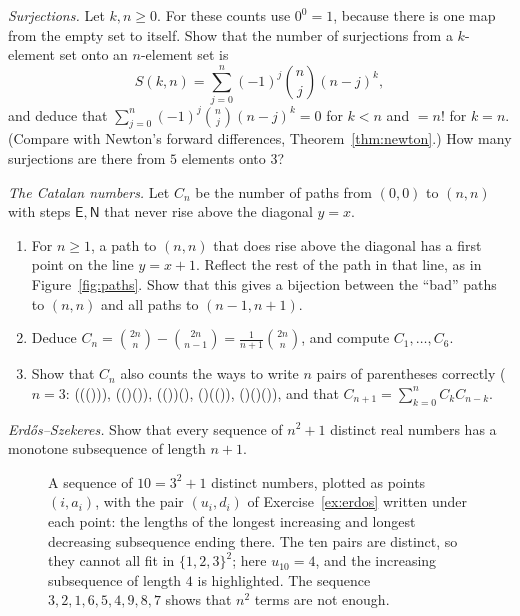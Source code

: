 \begin{exercise}[$\star\star$]\label{ex:surj}
\emph{Surjections.} Let $k,n\ge0$. For these counts use $0^0=1$, because there is one map from the empty set to itself. Show that the number of surjections from a $k$-element set onto an $n$-element set is
\[
S(k,n)=\sum_{j=0}^n(-1)^j\binom nj(n-j)^k ,
\]
and deduce that $\sum_{j=0}^n(-1)^j\binom nj(n-j)^k=0$ for $k<n$ and $=n!$ for $k=n$. (Compare with Newton's forward differences, Theorem~\ref{thm:newton}.) How many surjections are there from $5$ elements onto $3$?
\end{exercise}

\begin{exercise}[$\star\star\star$]\label{ex:catalan}
\emph{The Catalan numbers.} Let $C_n$ be the number of paths from $(0,0)$ to $(n,n)$ with steps $\mathsf E,\mathsf N$ that never rise above the diagonal $y=x$.
\begin{enumerate}[label=(\alph*)]
\item For $n\ge1$, a path to $(n,n)$ that does rise above the diagonal has a first point on the line $y=x+1$. Reflect the rest of the path in that line, as in Figure~\ref{fig:paths}. Show that this gives a bijection between the ``bad'' paths to $(n,n)$ and all paths to $(n-1,n+1)$.
\item Deduce $C_n=\binom{2n}n-\binom{2n}{n-1}=\frac1{n+1}\binom{2n}n$, and compute $C_1,\dots,C_6$.
\item Show that $C_n$ also counts the ways to write $n$ pairs of parentheses correctly ($n=3$: ((())), (()()), (())(), ()(()), ()()()), and that $C_{n+1}=\sum_{k=0}^nC_kC_{n-k}$.
\end{enumerate}
\end{exercise}

\begin{exercise}[$\star\star\star$]\label{ex:erdos}
\emph{Erd\H{o}s--Szekeres.} Show that every sequence of $n^2+1$ distinct real numbers has a monotone subsequence of length $n+1$.
\end{exercise}
\begin{figure}[ht]
\centering
{}
\caption{A sequence of $10=3^2+1$ distinct numbers, plotted as points $(i,a_i)$, with the pair $(u_i,d_i)$ of Exercise~\ref{ex:erdos} written under each point: the lengths of the longest increasing and longest decreasing subsequence ending there. The ten pairs are distinct, so they cannot all fit in $\{1,2,3\}^2$; here $u_{10}=4$, and the increasing subsequence of length $4$ is highlighted. The sequence $3,2,1,6,5,4,9,8,7$ shows that $n^2$ terms are not enough.}
\label{fig:erdos}
\end{figure}

